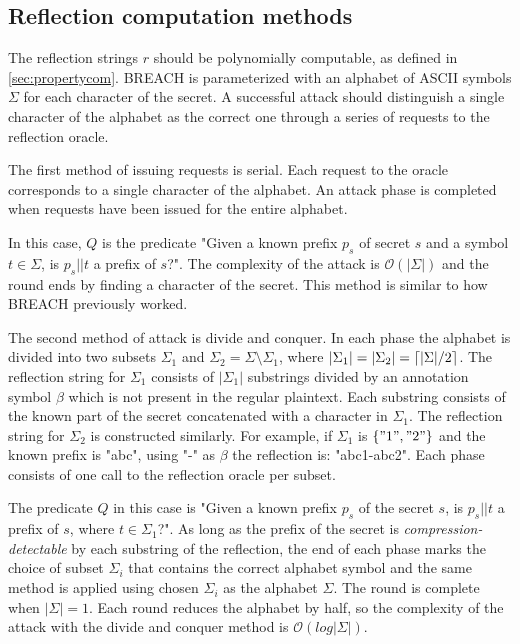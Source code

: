 \documentclass[conference, letterpaper, 10pt]{IEEEtran}
\DeclarePairedDelimiter{\ceil}{\lceil}{\rceil}
\begin{document}
\subsection{Reflection computation methods}\label{subsec:reflectionmethods}
The reflection strings $r$ should be polynomially computable, as defined in
\ref{sec:propertycom}. BREACH is
parameterized with an alphabet of ASCII symbols $\Sigma$
for each character of the
secret. A successful attack should distinguish a single character of the
alphabet as the correct one through a series of requests to the reflection
oracle.

The first method of issuing requests is serial. Each request to the oracle
corresponds to a single character of the alphabet. An attack phase is completed
when requests have been issued for the entire alphabet.

In this case, $Q$ is the predicate "Given a known prefix $p_s$ of secret $s$ and
a symbol $t \in \Sigma$, is $p_s || t$ a prefix of $s$?". The complexity of the attack is $\mathcal{O}(|\Sigma|)$ and
the round ends by finding a character of the secret. This method is similar to
how BREACH previously worked.

The second method of attack is divide and conquer. In each phase the alphabet is
divided into two subsets $\Sigma_1$ and $\Sigma_2 =
\Sigma
\setminus \Sigma_1$, where $|\Sigma_1| = |\Sigma_2| =
\ceil{|\Sigma| / 2}$. The reflection string for $\Sigma_1$ consists of
$|\Sigma_1|$ substrings divided by an annotation symbol $\beta$ which is not
present in the regular plaintext. Each
substring consists of the known part of the secret concatenated with a character
in $\Sigma_1$. The reflection string for $\Sigma_2$ is constructed
similarly. For example, if $\Sigma_1$ is $\{"1", "2"\}$ and the known prefix is
"abc", using "-" as $\beta$ the reflection is: "abc1-abc2".
Each phase consists of one call to the reflection oracle per subset.

The predicate $Q$ in this case is "Given a known prefix $p_s$ of the secret $s$, is
$p_s || t$ a
prefix of $s$, where $t \in \Sigma_1$?". As long as the prefix of the
secret is \textit{compression-detectable} by each substring of the reflection,
the end of each phase marks the choice of subset $\Sigma_i$ that contains
the correct alphabet symbol and the same method is applied using chosen
$\Sigma_i$ as the alphabet $\Sigma$. The round is complete when
$|\Sigma| = 1$. Each round reduces the alphabet by half, so the complexity
of the attack with the divide and conquer method  is
$\mathcal{O}(log|\Sigma|)$.
\end{document}
